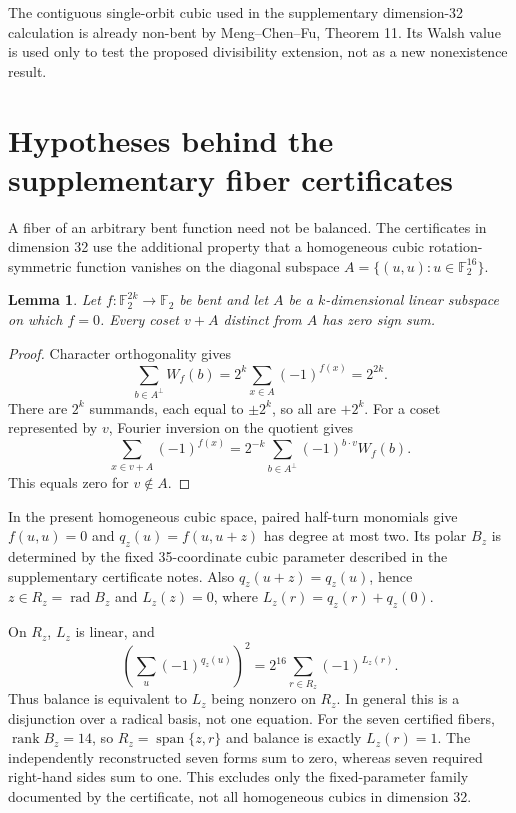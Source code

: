 \documentclass[11pt,a4paper]{article}
\newtheorem{lemma}[theorem]{Lemma}
\newcommand{\F}{\mathbb F_2}
\begin{document}
The contiguous single-orbit cubic used in the supplementary dimension-32 calculation is already non-bent by Meng--Chen--Fu, Theorem 11. Its Walsh value is used only to test the proposed divisibility extension, not as a new nonexistence result.\par

\section{Hypotheses behind the supplementary fiber certificates}
A fiber of an arbitrary bent function need not be balanced. The certificates in dimension 32 use the additional property that a homogeneous cubic rotation-symmetric function vanishes on the diagonal subspace $A=\{(u,u):u\in\F^{16}\}$.

\begin{lemma}\label{lem:fiber}
Let $f:\F^{2k}\to\F$ be bent and let $A$ be a $k$-dimensional linear subspace on which $f=0$. Every coset $v+A$ distinct from $A$ has zero sign sum.
\end{lemma}
\begin{proof}
Character orthogonality gives
\[
 \sum_{b\in A^\perp}W_f(b)
 =2^k\sum_{x\in A}(-1)^{f(x)}=2^{2k}.
\]
There are $2^k$ summands, each equal to $\pm2^k$, so all are $+2^k$. For a coset represented by $v$, Fourier inversion on the quotient gives
\[
 \sum_{x\in v+A}(-1)^{f(x)}
 =2^{-k}\sum_{b\in A^\perp}(-1)^{b\cdot v}W_f(b).
\]
This equals zero for $v\notin A$.
\end{proof}
In the present homogeneous cubic space, paired half-turn monomials give $f(u,u)=0$ and $q_z(u)=f(u,u+z)$ has degree at most two. Its polar $B_z$ is determined by the fixed 35-coordinate cubic parameter described in the supplementary certificate notes. Also $q_z(u+z)=q_z(u)$, hence $z\in R_z=\operatorname{rad}B_z$ and $L_z(z)=0$, where $L_z(r)=q_z(r)+q_z(0)$.

On $R_z$, $L_z$ is linear, and
\[
 \left(\sum_u(-1)^{q_z(u)}\right)^2
 =2^{16}\sum_{r\in R_z}(-1)^{L_z(r)}.
\]
Thus balance is equivalent to $L_z$ being nonzero on $R_z$. In general this is a disjunction over a radical basis, not one equation. For the seven certified fibers, $\operatorname{rank}B_z=14$, so $R_z=\operatorname{span}\{z,r\}$ and balance is exactly $L_z(r)=1$. The independently reconstructed seven forms sum to zero, whereas seven required right-hand sides sum to one. This excludes only the fixed-parameter family documented by the certificate, not all homogeneous cubics in dimension 32.
\end{document}
